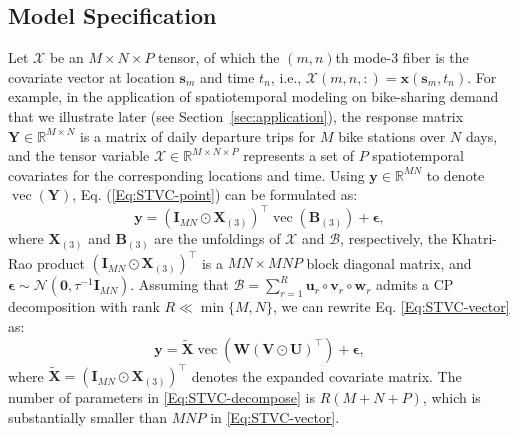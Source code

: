 \documentclass[12pt]{article}
\newcommand{\bd}[1]{\boldsymbol{#1}}
\begin{document}
\subsection{Model Specification}

Let $\boldsymbol{\mathcal{X}}$ be an $M\times N\times P$ tensor, of which the $(m,n)$th mode-3 fiber is the covariate vector at location $\bd{s}_{m}$ and time $t_n$, i.e., $\boldsymbol{\mathcal{X}}{(m,n,:)}=\boldsymbol{x}\left(\bd{s}_m,t_n\right)$. For example, in the application of spatiotemporal modeling on bike-sharing demand that we illustrate later (see Section~\ref{sec:application}), the response matrix $\boldsymbol{Y}\in\mathbb{R}^{M\times N}$ is a matrix of daily departure trips for $M$ bike stations over $N$ days, and the tensor variable $\boldsymbol{\mathcal{X}}\in\mathbb{R}^{M\times N\times P}$ represents a set of $P$ spatiotemporal covariates for the corresponding locations and time. Using $\boldsymbol{y}\in\mathbb{R}^{MN}$ to denote $\operatorname{vec}(\boldsymbol{Y})$, Eq. (\ref{Eq:STVC-point}) can be formulated as:
\begin{equation} \label{Eq:STVC-vector}
    \boldsymbol{y}=\left(\boldsymbol{I}_{MN}\odot\boldsymbol{X}_{(3)}\right)^{\top}\operatorname{vec}\left(\boldsymbol{B}_{(3)}\right)+\boldsymbol{\epsilon},
\end{equation}
where $\boldsymbol{X}_{(3)}$ and $\boldsymbol{B}_{(3)}$ are the unfoldings of $\boldsymbol{\mathcal{X}}$ and $\boldsymbol{\mathcal{B}}$, respectively, the Khatri-Rao product $\left(\boldsymbol{I}_{MN}\odot\boldsymbol{X}_{(3)}\right)^{\top}$ is a $MN\times MNP$ block diagonal matrix, and $\boldsymbol{\epsilon}\sim\mathcal{N}(\boldsymbol{0},\tau^{-1}\boldsymbol{I}_{MN})$. Assuming that $\boldsymbol{\mathcal{B}}=\sum_{r=1}^{R}\boldsymbol{u}_{r}\circ\boldsymbol{v}_{r}\circ\boldsymbol{w}_{r}$ admits a CP decomposition with rank $R\ll\min\{M,N\}$, we can rewrite Eq. \eqref{Eq:STVC-vector} as:
\begin{equation} \label{Eq:STVC-decompose}
    \boldsymbol{y}=\tilde{\bd{X}}\operatorname{vec}\left(\boldsymbol{W}(\boldsymbol{V}\odot\boldsymbol{U})^{\top}\right)+\boldsymbol{\epsilon},
\end{equation}
where $\tilde{\bd{X}}=\left(\boldsymbol{I}_{MN}\odot\boldsymbol{X}_{(3)}\right)^{\top}$ denotes the expanded covariate matrix. The number of parameters in \eqref{Eq:STVC-decompose} is $R(M+N+P)$, which is substantially smaller than $M N P$ in \eqref{Eq:STVC-vector}.
\end{document}
